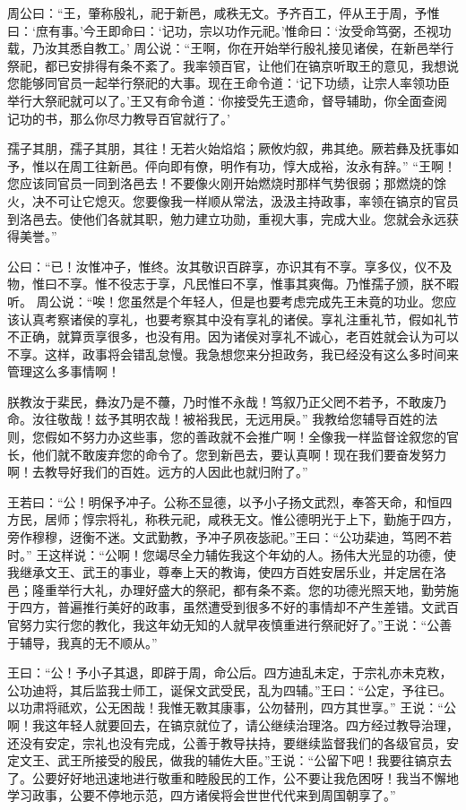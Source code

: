\documentclass[a4paper,12pt,UTF8,twoside]{ctexbook}
\begin{document}
周公曰：“王，肇称殷礼，祀于新邑，咸秩无文。予齐百工，伻从王于周，予惟曰：‘庶有事。’今王即命曰：‘记功，宗以功作元祀。’惟命曰：‘汝受命笃弼，丕视功载，乃汝其悉自教工。’
周公说：“王啊，你在开始举行殷礼接见诸侯，在新邑举行祭祀，都已安排得有条不紊了。我率领百官，让他们在镐京听取王的意见，我想说您能够同官员一起举行祭祀的大事。现在王命令道：‘记下功绩，让宗人率领功臣举行大祭祀就可以了。’王又有命令道：‘你接受先王遗命，督导辅助，你全面查阅记功的书，那么你尽力教导百官就行了。’

孺子其朋，孺子其朋，其往！无若火始焰焰；厥攸灼叙，弗其绝。厥若彝及抚事如予，惟以在周工往新邑。伻向即有僚，明作有功，惇大成裕，汝永有辞。”
“王啊！您应该同官员一同到洛邑去！不要像火刚开始燃烧时那样气势很弱；那燃烧的馀火，决不可让它熄灭。您要像我一样顺从常法，汲汲主持政事，率领在镐京的官员到洛邑去。使他们各就其职，勉力建立功勋，重视大事，完成大业。您就会永远获得美誉。”

公曰：“已！汝惟冲子，惟终。汝其敬识百辟享，亦识其有不享。享多仪，仪不及物，惟曰不享。惟不役志于享，凡民惟曰不享，惟事其爽侮。乃惟孺子颁，朕不暇听。
周公说：“唉！您虽然是个年轻人，但是也要考虑完成先王未竟的功业。您应该认真考察诸侯的享礼，也要考察其中没有享礼的诸侯。享礼注重礼节，假如礼节不正确，就算贡享很多，也没有用。因为诸侯对享礼不诚心，老百姓就会认为可以不享。这样，政事将会错乱怠慢。我急想您来分担政务，我已经没有这么多时间来管理这么多事情啊！

朕教汝于棐民，彝汝乃是不蘉，乃时惟不永哉！笃叙乃正父罔不若予，不敢废乃命。汝往敬哉！兹予其明农哉！被裕我民，无远用戾。”
我教给您辅导百姓的法则，您假如不努力办这些事，您的善政就不会推广啊！全像我一样监督诠叙您的官长，他们就不敢废弃您的命令了。您到新邑去，要认真啊！现在我们要奋发努力啊！去教导好我们的百姓。远方的人因此也就归附了。”

王若曰：“公！明保予冲子。公称丕显德，以予小子扬文武烈，奉答天命，和恒四方民，居师；惇宗将礼，称秩元祀，咸秩无文。惟公德明光于上下，勤施于四方，旁作穆穆，迓衡不迷。文武勤教，予冲子夙夜毖祀。”王曰：“公功棐迪，笃罔不若时。”
王这样说：“公啊！您竭尽全力辅佐我这个年幼的人。扬伟大光显的功德，使我继承文王、武王的事业，尊奉上天的教诲，使四方百姓安居乐业，并定居在洛邑；隆重举行大礼，办理好盛大的祭祀，都有条不紊。您的功德光照天地，勤劳施于四方，普遍推行美好的政事，虽然遭受到很多不好的事情却不产生差错。文武百官努力实行您的教化，我这年幼无知的人就早夜慎重进行祭祀好了。”王说：“公善于辅导，我真的无不顺从。”

王曰：“公！予小子其退，即辟于周，命公后。四方迪乱未定，于宗礼亦未克敉，公功迪将，其后监我士师工，诞保文武受民，乱为四辅。”王曰：“公定，予往已。以功肃将祗欢，公无困哉！我惟无斁其康事，公勿替刑，四方其世享。”
王说：“公啊！我这年轻人就要回去，在镐京就位了，请公继续治理洛。四方经过教导治理，还没有安定，宗礼也没有完成，公善于教导扶持，要继续监督我们的各级官员，安定文王、武王所接受的殷民，做我的辅佐大臣。”王说：“公留下吧！我要往镐京去了。公要好好地迅速地进行敬重和睦殷民的工作，公不要让我危困呀！我当不懈地学习政事，公要不停地示范，四方诸侯将会世世代代来到周国朝享了。”
\end{document}
